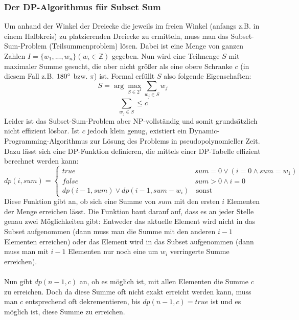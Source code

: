 \documentclass[a4paper, notitlepage, 12pt]{scrartcl}
\begin{document}
  \subsubsection{Der DP-Algorithmus für Subset Sum}
  Um anhand der Winkel der Dreiecke die jeweils im freien Winkel (anfangs z.B. in einem Halbkreis) zu platzierenden Dreiecke zu ermitteln, muss man das Subset-Sum-Problem (Teilsummenproblem) lösen. Dabei ist eine Menge von ganzen Zahlen $I = \{w_1,...,w_n\} (w_i \in \mathbb{Z})$ gegeben. Nun wird eine Teilmenge $S$ mit maximaler Summe gesucht, die aber nicht größer als eine obere Schranke $c$ (in diesem Fall z.B. $180\degree$ bzw. $\pi$) ist. Formal erfüllt $S$ also folgende Eigenschaften:
  \begin{equation}
  S = \arg \max_{S \in 2^I} \sum_{w_j \in S} w_j
  \end{equation}
  \begin{equation}
  \sum_{w_j \in S} \leq c
  \end{equation}
  Leider ist das Subset-Sum-Problem aber NP-vollständig und somit grundsätzlich nicht effizient lösbar. Ist $c$ jedoch klein genug, existiert ein Dynamic-Programming-Algorithmus zur Lösung des Problems in pseudopolynomieller Zeit.\cite{Src:dpsum} Dazu lässt sich eine DP-Funktion definieren, die mittels einer DP-Tabelle effizient berechnet werden kann:
  \begin{equation}
  dp(i,sum) = 
  \begin{cases}
  true & sum = 0 \vee (i = 0 \wedge sum = w_1) \\
  false & sum > 0 \wedge i = 0 \\
  dp(i-1,sum) \vee dp(i-1,sum-w_i) & \, \text{sonst}
  \end{cases}
  \end{equation}
  Diese Funktion gibt an, ob sich eine Summe von $sum$ mit den ersten $i$ Elementen der Menge erreichen lässt. Die Funktion baut darauf auf, dass es an jeder Stelle genau zwei Möglichkeiten gibt: Entweder das aktuelle Element wird nicht in das Subset aufgenommen (dann muss man die Summe mit den anderen $i-1$ Elementen erreichen) oder das Element wird in das Subset aufgenommen (dann muss man mit $i-1$ Elementen nur noch eine um $w_i$ verringerte Summe erreichen). \\ \\
  Nun gibt $dp(n-1,c)$ an, ob es möglich ist, mit allen Elementen die Summe $c$ zu erreichen. Doch da diese Summe oft nicht exakt erreicht werden kann, muss man $c$ entsprechend oft dekrementieren, bis $dp(n-1,c) = true$ ist und es möglich ist, diese Summe zu erreichen. \\ \\
\end{document}
